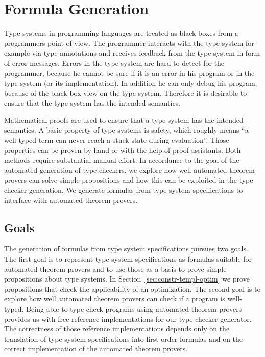 \chapter{Formula Generation}
\label{ch:formula-generation}
Type systems in programming languages are treated as black boxes from
a programmers point of view. The programmer interacts with the type
system for example via type annotations and receives feedback from the
type system in form of error messages. Errors in the type system are
hard to detect for the programmer, because he cannot be sure if it is
an error in his program or in the type system (or its
implementation). In addition he can only debug his program, because of
the black box view on the type system. Therefore it is desirable to
ensure that the type system has the intended semantics.

Mathematical proofs are used to ensure that a type system has the
intended semantics. A basic property of type systems is safety, which
roughly means ``a well-typed term can never reach a stuck state during
evaluation''\cite{Pierce:2002:TPL:509043}. Those properties can be
proven by hand or with the help of proof assistants. Both methods
require substantial manual effort. In accordance to the goal of the
automated generation of type checkers, we explore how well automated
theorem provers can solve simple propositions and how this can be
exploited in the type checker generation. We generate formulas from
type system specifications to interface with automated theorem
provers.
 
\section{Goals}
The generation of formulas from type system specifications pursues two
goals. The first goal is to represent type system specifications as
formulas suitable for automated theorem provers and to use those as a
basis to prove simple propositions about type systems. In
Section~\ref{sec:constr-templ-optim} we prove propositions that check
the applicability of an optimization. The second goal is to explore
how well automated theorem provers can check if a program is
well-typed. Being able to type check programs using automated theorem
provers provides us with free reference implementations for our type
checker generator. The correctness of those reference implementations
depends only on the translation of type system specifications into
first-order formulas and on the correct implementation of the
automated theorem provers.

